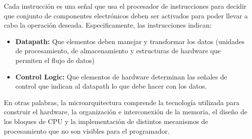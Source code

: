 Cada instrucción es una señal que usa el procesador de instrucciones para decidir que conjunto de componentes electrónicos deben ser activados para poder llevar a cabo la operación deseada. Especificamente, las instrucciones indican: 

\begin{itemize}
	\item \textbf{Datapath:} Que elementos deben manejar y transformar los datos (unidades de procesamiento, de almacenamiento y estructuras de hardware que permiten el flujo de datos)
	\item \textbf{Control Logic:} Que elementos de hardware determinan las señales de control que indican al datapath lo que debe hacer con los datos.
\end{itemize}

En otras palabras, la microarquitectura comprende la tecnología utilizada para construir el hardware, la organización e interconexión de la memoria, el diseño de los bloques de CPU y la implementación de distintos mecanismos de procesamiento que no son visibles para el programador. 

%
%
%
%
%
